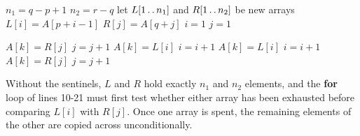 \begin{algorithmic}[1]
  \STATE $n_1 = q - p + 1$
  \STATE $n_2 = r - q$
  \STATE let $L[1\mathinner{{\ldotp}\,{\ldotp}} n_1]$ and $R[1\mathinner{{\ldotp}\,{\ldotp}} n_2]$ be new arrays
  \STATE $L[i] = A[p + i - 1]$
  \ENDFOR
  \STATE $R[j] = A[q + j]$
  \ENDFOR
  \STATE $i = 1$
  \STATE $j = 1$

  \STATE $A[k] = R[j]$
  \STATE $j = j + 1$
  \STATE $A[k] = L[i]$
  \STATE $i = i + 1$
  \STATE $A[k] = L[i]$
  \STATE $i = i + 1$
  \ELSE
  \STATE $A[k] = R[j]$
  \STATE $j = j + 1$
  \ENDIF
  \ENDFOR
\end{algorithmic}

Without the sentinels, $L$ and $R$ hold exactly $n_1$ and $n_2$ elements, and
the \textbf{for} loop of lines 10-21 must first test whether either array has
been exhausted before comparing $L[i]$ with $R[j]$. Once one array is spent,
the remaining elements of the other are copied across unconditionally.

